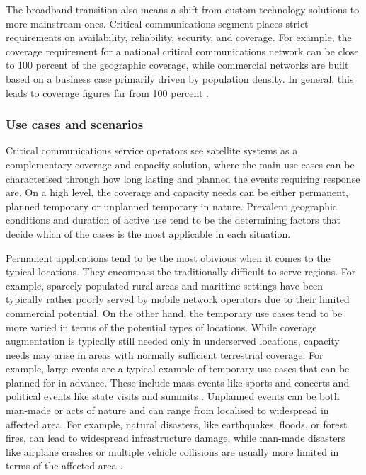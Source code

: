 \documentclass[english, 12pt, a4paper, elec, utf8, a-1b, online]{aaltothesis}
\begin{document}
The broadband transition also means a shift from custom technology solutions to more mainstream ones. Critical communications segment places strict requirements on availability, reliability, security, and coverage. For example, the coverage requirement for a national critical communications network can be close to 100 percent of the geographic coverage, while commercial networks are built based on a business case primarily driven by population density. In general, this leads to coverage figures far from 100 percent \cite{saynevirta2021satellite}.

\subsubsection{Use cases and scenarios}
Critical communications service operators see satellite systems as a complementary coverage and capacity solution, where the main use cases can be characterised through how long lasting and planned the events requiring response are.
On a high level, the coverage and capacity needs can be either permanent, planned temporary or unplanned temporary in nature.
Prevalent geographic conditions and duration of active use tend to be the determining factors that decide which of the cases is the most applicable in each situation.

Permanent applications tend to be the most obivious when it comes to the typical locations. They encompass the traditionally difficult-to-serve regions.
For example, sparcely populated rural areas and maritime settings have been typically rather poorly served by mobile network operators due to their limited commercial potential.
On the other hand, the temporary use cases tend to be more varied in terms of the potential types of locations. While coverage augmentation is typically still needed only in underserved locations, capacity needs may arise in areas with normally sufficient terrestrial coverage.
For example, large events are a typical example of temporary use cases that can be planned for in advance. These include mass events like sports and concerts and political events like state visits and summits \cite{erve2018trump, tcca2021airbus, airbus2023bahrain}.
Unplanned events can be both man-made or acts of nature and can range from localised to widespread in affected area. For example, natural disasters, like earthquakes, floods, or forest fires, can lead to widespread infrastructure damage, while man-made disasters like airplane crashes or multiple vehicle collisions are usually more limited in terms of the affected area \cite{firstnet2021wildfire, firstnet2021nashville}.
\end{document}
